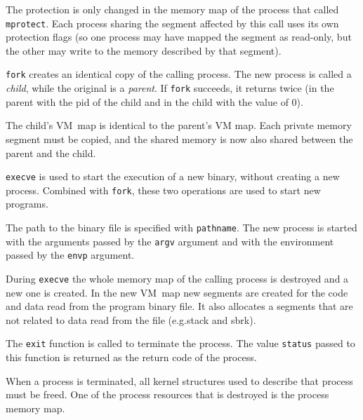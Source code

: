 \begin{description}[style=nextline]
    The protection is only changed in the memory map of the process that called \texttt{mprotect}.
    Each process sharing the segment affected by this call uses its own protection flags
    (so one process may have mapped the segment as read-only,
    but the other may write to the memory described by that segment).

  \item[\texttt{pid_t fork(void);}]
    \texttt{fork} creates an identical copy of the calling process.
    The new process is called a {\it child}, while the original is a {\it parent}.
    If \texttt{fork} succeeds, it returns twice (in the parent with the pid of the child and in the child with the value of 0).

    The child's VM~map is identical to the parent's VM map.
    Each private memory segment must be copied, and the shared memory is now also shared between the parent and the child.

  \item[\texttt{int execve(const char *pathname, char *argv[], char *envp[]);}]
    \texttt{execve} is used to start the execution of a new binary, without creating a new process.
    Combined with \texttt{fork}, these two operations are used to start new programs.

    The path to the binary file is specified with \texttt{pathname}.
    The new process is started with the arguments passed by the \texttt{argv} argument
    and with the environment passed by the \texttt{envp} argument.

    During \texttt{execve} the whole memory map of the calling process is destroyed and a new one is created.
    In the new VM~map  new segments are created for the code and data read from the program binary file.
    It also allocates a segments that are not related to data read from the file (e.g.stack and sbrk).

  \item[\texttt{void exit(int status);}]
    The \texttt{exit} function is called to terminate the process.
    The value \texttt{status} passed to this function is returned as the return code of the process.

    When a process is terminated, all kernel structures used to describe that process must be freed.
    One of the process resources that is destroyed is the process memory map.

\end{description}

